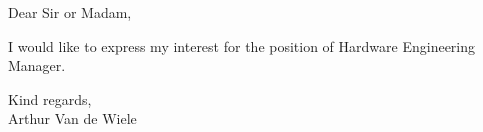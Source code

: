 \date{\today}
\opening{}
\closing{}

\makeletterhead

Dear Sir or Madam,

I would like to express my interest for the position of Hardware Engineering Manager.

Kind regards,\\
Arthur Van de Wiele